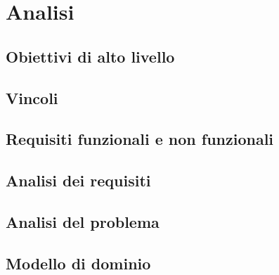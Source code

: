\chapter{Analisi}
\label{chap:analisi}
    \section{Obiettivi di alto livello}
    \label{sec:obiettivi_alto_livello}
    \section{Vincoli}
    \label{sec:vincoli}
    \section{Requisiti funzionali e non funzionali}
    \label{sec:requisiti_funzionali_non_funzionali}
    \section{Analisi dei requisiti}
    \label{sec:analisi_requisiti}
    \section{Analisi del problema}
    \label{sec:analisi_problema}
    \section{Modello di dominio}
    \label{sec:modello_dominio}